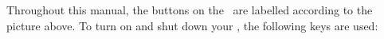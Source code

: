 \begin{center}
\end{center}

Throughout this manual, the buttons on the \dap\ are labelled according to the
picture above. To turn on and shut down your \dap, the following keys are used:

